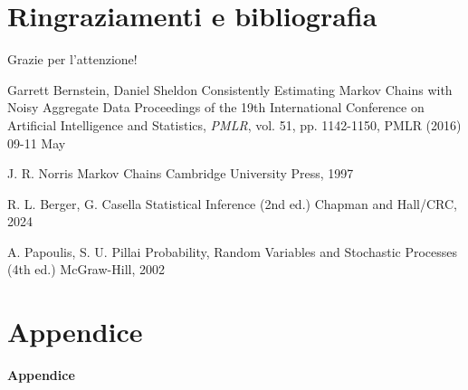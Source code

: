 \documentclass[10pt,xcolor={table,dvipsnames}]{beamer} 		%
\theoremstyle{plain}					%
\theoremstyle{definition}
\theoremstyle{remark}
\begin{document}
	

    
\section{Ringraziamenti e bibliografia}
    \begin{frame}
        \begin{center}
            \Huge{Grazie per l'attenzione!}
        \end{center}
    \end{frame}

	\begin{frame}{\refname}
		\begin{thebibliography}{9}
			 Garrett Bernstein, Daniel Sheldon
			\newblock Consistently Estimating Markov Chains with Noisy Aggregate Data
			\newblock Proceedings of the 19th International Conference on Artificial Intelligence and Statistics, \emph{PMLR}, vol. 51, pp. 1142-1150, PMLR (2016) 09-11 May

			 J. R. Norris
			\newblock Markov Chains
			\newblock Cambridge University Press, 1997

			 R. L. Berger, G. Casella
			\newblock Statistical Inference (2nd ed.)
			\newblock Chapman and Hall/CRC, 2024

			 A. Papoulis, S. U. Pillai
			\newblock Probability, Random Variables and Stochastic Processes (4th ed.)
			\newblock McGraw-Hill, 2002
		\end{thebibliography}
	\end{frame}


\section*{Appendice}
	\begin{frame}
		\begin{center}
			\Huge{\textbf{Appendice}}
		\end{center}
	\end{frame}
\end{document}
